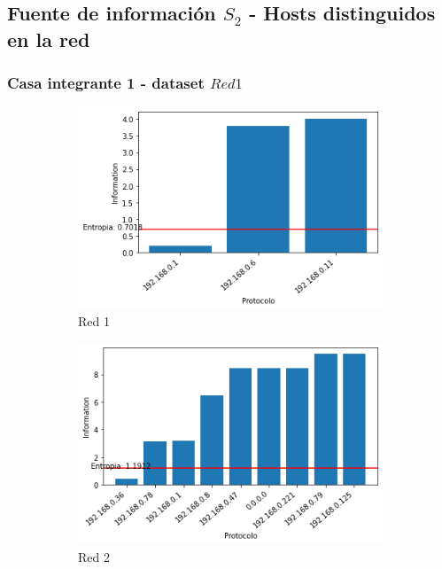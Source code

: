 \subsection{Fuente de información $S_{2}$ - Hosts distinguidos en la red } 
\subsubsection{Casa integrante 1 - dataset $Red 1$}

\begin{figure}[H]
    \centering
    \begin{subfigure}{0.5\linewidth} 
        \includegraphics[scale=0.5]{images/resultados_generales/red_1_info.png}
        \centering
        \caption{Red 1}
    \end{subfigure}
    \begin{subfigure}{0.5\linewidth} 
        \includegraphics[scale=0.5]{images/resultados_generales/red_2_info.png}
        \centering
        \caption{Red 2}
    \end{subfigure}
    \begin{subfigure}{0.5\linewidth} 
        \centering

\end{subfigure}
\end{figure}
